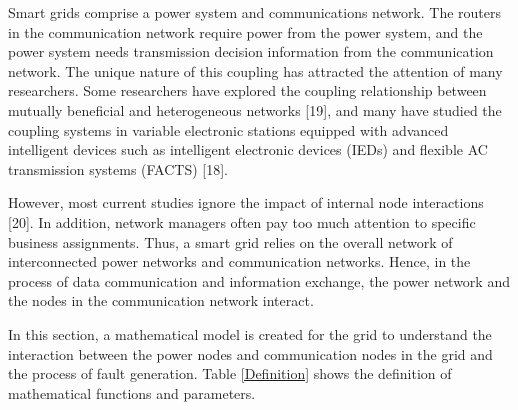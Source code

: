 \documentclass[AMA,STIX1COL]{WileyNJD-v2}
\begin{document}
\par Smart grids comprise a power system and communications network. The routers in the communication network require power from the power system, and the power system needs transmission decision information from the communication network.  The unique nature of this coupling has attracted the attention of many researchers. Some researchers have explored the coupling relationship between mutually beneficial and heterogeneous networks [19], and many have studied the coupling systems in variable electronic stations equipped with advanced intelligent devices such as intelligent electronic devices (IEDs) and flexible AC transmission systems (FACTS) [18].
\par However, most current studies ignore the impact of internal node interactions [20]. In addition, network managers often pay too much attention to specific business assignments. Thus, a smart grid relies on the overall network of interconnected power networks and communication networks. Hence, in the process of data communication and information exchange, the power network and the nodes in the communication network interact.
\par In this section, a mathematical model is created for the grid to understand the interaction between the power nodes and communication nodes in the grid and the process of fault generation. Table \ref{Definition} shows the definition of mathematical functions and parameters. 
\end{document}
